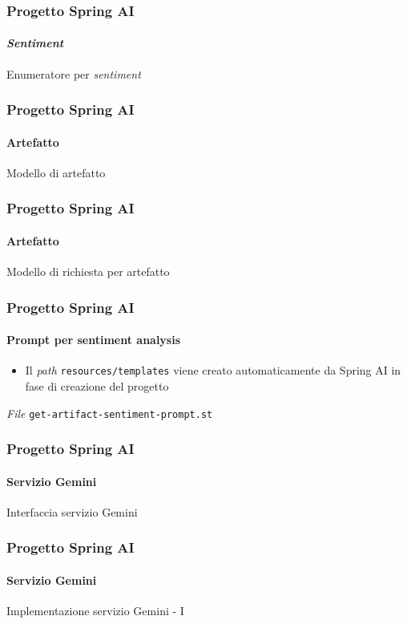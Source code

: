 %
\begin{frame}[t,fragile] \frametitle{Progetto Spring AI}
    \framesubtitle{\textit{Sentiment}}
        \begin{block}{Enumeratore per \textit{sentiment}}
			{\tiny}
    	\end{block}
\end{frame}
%
\begin{frame}[t,fragile] \frametitle{Progetto Spring AI}
    \framesubtitle{Artefatto}
        \begin{block}{Modello di artefatto}
			{\tiny}
    	\end{block}
\end{frame}
%
\begin{frame}[t,fragile] \frametitle{Progetto Spring AI}
    \framesubtitle{Artefatto}
        \begin{block}{Modello di richiesta per artefatto}
			{\tiny}
    	\end{block}
\end{frame}
%
\begin{frame}[t,fragile] \frametitle{Progetto Spring AI}
    \framesubtitle{Prompt per sentiment analysis}
        \begin{itemize}[leftmargin=10pt,align=right]
		    \item[\alert{\faExclamationTriangle}] Il \textit{path} \texttt{resources/templates} viene creato automaticamente da Spring AI in fase di creazione del progetto
        \end{itemize}
        \begin{block}{\textit{File} \texttt{get-artifact-sentiment-prompt.st}}
			{\scriptsize}
    	\end{block}
\end{frame}
%
\begin{frame}[t,fragile] \frametitle{Progetto Spring AI}
    \framesubtitle{Servizio Gemini}
        \begin{block}{Interfaccia servizio Gemini}
{\tiny}
    \end{block}
\end{frame}
%
\begin{frame}[t,fragile] \frametitle{Progetto Spring AI}
    \framesubtitle{Servizio Gemini}
		\vspace*{-.7cm}
        \begin{block}{Implementazione servizio Gemini - I}
            {\tiny}
    \end{block}
\end{frame}
